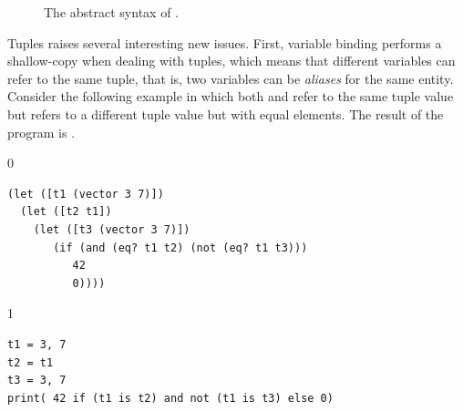 \documentclass[7x10]{TimesAPriori_MIT}%
\newcommand{\gray}[1]{{\color{gray} #1}}
\def\racketEd{0}
\def\pythonEd{1}
\def\edition{1}
\begin{document}
\begin{figure}[tp]
\centering
\fbox{
\begin{minipage}{0.96\textwidth}
{\if\edition\racketEd    
\[
\begin{array}{l}
  \gray{\LintOpAST} \\ \hline
  \gray{\LvarASTRacket{}} \\ \hline
  \gray{\LifASTRacket{}} \\ \hline
  \gray{\LwhileASTRacket{}} \\ \hline
  \LtupASTRacket{} \\
\begin{array}{lcl}
  \LangVecM{} &::=& \PROGRAM{\key{'()}}{\Exp}
\end{array}
\end{array}
\]
\fi}
{\if\edition\pythonEd
\[
\begin{array}{l}
  \gray{\LintASTPython} \\ \hline
  \gray{\LvarASTPython} \\ \hline
  \gray{\LifASTPython} \\ \hline
  \gray{\LwhileASTPython} \\ \hline
  \LtupASTPython \\
  \begin{array}{lcl}
    \LangLoopM{} &::=& \PROGRAM{\code{'()}}{\Stmt^{*}}
  \end{array}
\end{array}
\]
\fi}
\end{minipage}
}
\caption{The abstract syntax of \LangVec{}.}
\label{fig:Lvec-syntax}
\end{figure}

Tuples raises several interesting new issues.  First, variable binding
performs a shallow-copy when dealing with tuples, which means that
different variables can refer to the same tuple, that is, two
variables can be \emph{aliases} for the same
entity. Consider the following example in which both  and
 refer to the same tuple value but  refers to a
different tuple value but with equal elements. The result of the
program is .


\begin{center}
\begin{minipage}{0.96\textwidth}
{\if\edition\racketEd        
\begin{lstlisting}
(let ([t1 (vector 3 7)])
  (let ([t2 t1])
    (let ([t3 (vector 3 7)])
       (if (and (eq? t1 t2) (not (eq? t1 t3)))
          42
          0))))
\end{lstlisting}
\fi}
{\if\edition\pythonEd
\begin{lstlisting}
t1 = 3, 7
t2 = t1
t3 = 3, 7
print( 42 if (t1 is t2) and not (t1 is t3) else 0)
\end{lstlisting}
\fi}
\end{minipage}
\end{center}
\end{document}
